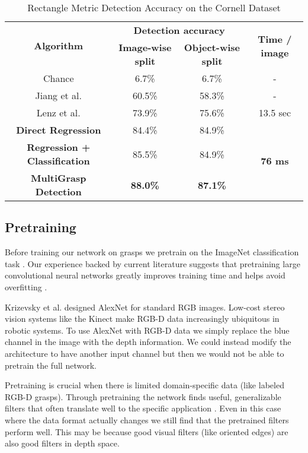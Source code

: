 \documentclass[letterpaper, 10 pt, conference]{ieeeconf}
\begin{document}
\begin{table*}[tb]
\caption{Rectangle Metric Detection Accuracy on the Cornell Dataset}
\label{results}
\begin{center}
\begin{tabular}{|c|c|c|c|}
\hline
\multirow{2}{*}{\textbf{Algorithm}} & \multicolumn{2}{|c|}{\textbf{Detection accuracy}} & \multirow{2}{*}{\textbf{Time / image}}\\
\hhline{~--~}
& \textbf{Image-wise split} & \textbf{Object-wise split} & \\
\hline
\hline
Chance \cite{lenz2013deep}& 6.7\% & 6.7\% & - \\
\hline
Jiang et al. \cite{lenz2013deep} & 60.5\% & 58.3\% & - \\
\hline
Lenz et al. \cite{lenz2013deep} & 73.9\% & 75.6\% & 13.5 sec\\
\hline
\hline
\textbf{Direct Regression} & 84.4\% & 84.9\% & \multirow{3}{*}{\textbf{76 ms}}\\
\hhline{---~}
\textbf{Regression + Classification} & 85.5\%& 84.9\% & \\
\hhline{---~}
\textbf{MultiGrasp Detection} & \textbf{88.0\%} & \textbf{87.1\%} & \\
\hline
\end{tabular}
\end{center}
\end{table*}

\subsection{Pretraining}

Before training our network on grasps we pretrain on the ImageNet classification task \cite{deng2009imagenet}. Our experience backed by current literature suggests that pretraining large convolutional neural networks greatly improves training time and helps avoid overfitting \cite{oquab2013learning} \cite{donahue2013decaf}.

Krizevsky et al. designed AlexNet for standard RGB images. Low-cost stereo vision systems like the Kinect make RGB-D data increasingly ubiquitous in robotic systems. To use AlexNet with RGB-D data we simply replace the blue channel in the image with the depth information. We could instead modify the architecture to have another input channel but then we would not be able to pretrain the full network.

Pretraining is crucial when there is limited domain-specific data (like labeled RGB-D grasps). Through pretraining the network finds useful, generalizable filters that often translate well to the specific application \cite{donahue2013decaf}. Even in this case where the data format actually changes we still find that the pretrained filters perform well. This may be because good visual filters (like oriented edges) are also good filters in depth space.
\end{document}
